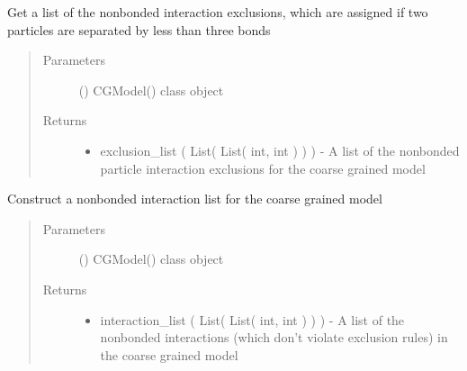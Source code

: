 \documentclass[letterpaper,12pt,english,openany,oneside]{sphinxmanual}
\begin{document}
\begin{fulllineitems}
\begin{fulllineitems}
\label{\detokenize{cg_model:cg_model.cgmodel.CGModel.get_nonbonded_exclusion_list}}
Get a list of the nonbonded interaction exclusions, which are assigned if two particles are separated by less than three bonds
\begin{quote}\begin{description}
\item[{Parameters}] \leavevmode
{} () \textendash{} CGModel() class object

\item[{Returns}] \leavevmode
\begin{itemize}
\item {} 
exclusion\_list ( List( List( int, int ) ) ) - A list of the nonbonded particle interaction exclusions for the coarse grained model

\end{itemize}


\end{description}\end{quote}

\end{fulllineitems}


\begin{fulllineitems}
\label{\detokenize{cg_model:cg_model.cgmodel.CGModel.get_nonbonded_interaction_list}}
Construct a nonbonded interaction list for the coarse grained model
\begin{quote}\begin{description}
\item[{Parameters}] \leavevmode
{} () \textendash{} CGModel() class object

\item[{Returns}] \leavevmode
\begin{itemize}
\item {} 
interaction\_list ( List( List( int, int ) ) ) - A list of the nonbonded interactions (which don’t violate exclusion rules) in the coarse grained model


\end{itemize}
\end{description}
\end{quote}
\end{fulllineitems}
\end{fulllineitems}
\end{document}
